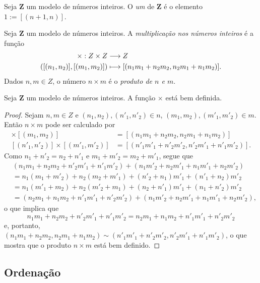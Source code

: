 \begin{defi}
	Seja $\bm Z$ um modelo de números inteiros. O \emph{um} de $\bm Z$ é o elemento $1 := [(n+1,n)]$.
\end{defi}

\begin{defi}
Seja $\bm Z$ um modelo de números inteiros. A \emph{multiplicação nos números inteiros} é a função
	\begin{align*}
	{\times}: {Z \times Z} &\longrightarrow {Z} \\{([(n_1,n_2)],[(m_1,m_2)])} &\longmapsto {[(n_1 m_1 + n_2 m_2,n_2 m_1+n_1 m_2)]}.
	\end{align*}
Dados $n,m \in Z$, o número $n \times m$ é o \emph{produto de $n$ e $m$}.
\end{defi}

\begin{teo}
	Seja $\bm Z$ um modelo de números inteiros. A função $\times$ está bem definida.
\end{teo}
\begin{proof}
	Sejam $n,m \in Z$ e $(n_1,n_2),(n'_1,n'_2) \in n$, $(m_1,m_2),(m'_1,m'_2) \in m$. Então $n \times m$ pode ser calculado por
\begin{align*}
	[(n_1,n_2)] \times [(m_1,m_2)] &= [(n_1 m_1 + n_2 m_2,n_2 m_1+n_1 m_2)] \\
	[(n'_1,n'_2)]\times [(m'_1,m'_2)] &= [(n'_1 m'_1 + n'_2 m'_2,n'_2 m'_1+n'_1 m'_2)].
	\end{align*}
Como $n_1+n'_2=n_2+n'_1$ e $m_1+m'_2=m_2+m'_1$, segue que
	\begin{align*}
	&(n_1 m_1 + n_2 m_2+n'_2 m'_1+n'_1 m'_2)+(n_1 m'_2 + n_2 m'_1 + n_1 m'_1+n_2 m'_2) \\
	&= n_1(m_1+m'_2)+n_2(m_2+m'_1)+(n'_2+n_1)m'_1+(n'_1+n_2)m'_2 \\
	&= n_1(m'_1+m_2)+n_2(m'_2+m_1)+(n_2+n'_1)m'_1+(n_1+n'_2)m'_2 \\
	&= (n_2 m_1+n_1 m_2+n'_1 m'_1 + n'_2 m'_2)+(n_1 m'_2 + n_2 m'_1 + n_1 m'_1+n_2 m'_2),
	\end{align*}
o que implica que
	\begin{equation*}
	n_1 m_1 + n_2 m_2+n'_2 m'_1+n'_1 m'_2=n_2 m_1+n_1 m_2+n'_1 m'_1 + n'_2 m'_2
	\end{equation*}
e, portanto, $(n_1 m_1 + n_2 m_2,n_2 m_1+n_1 m_2) \sim (n'_1 m'_1 + n'_2 m'_2,n'_2 m'_1+n'_1 m'_2)$, o que mostra que o produto $n \times m$ está bem definido.
\end{proof}

\subsection{Ordenação}

